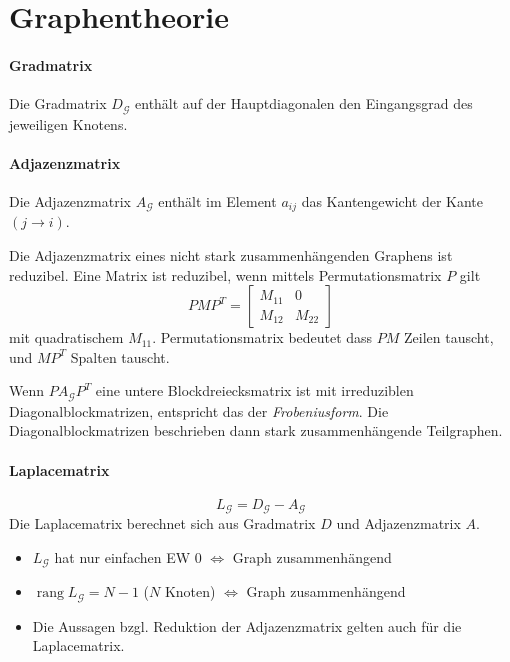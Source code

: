 \section{Graphentheorie}
\paragraph{Gradmatrix}
Die Gradmatrix $D_\mathcal{G}$ enthält auf der Hauptdiagonalen den Eingangsgrad des jeweiligen Knotens.

\paragraph{Adjazenzmatrix}
Die Adjazenzmatrix $A_\mathcal{G}$ enthält im Element $a_{ij}$
das Kantengewicht der Kante $(j \rightarrow i)$.

Die Adjazenzmatrix eines nicht stark zusammenhängenden Graphens ist reduzibel.
Eine Matrix ist reduzibel, wenn mittels Permutationsmatrix $P$ gilt
\begin{equation}
    PMP^T = \begin{bmatrix}
        M_{11} & 0 \\
        M_{12} & M_{22}
    \end{bmatrix}
\end{equation}
mit quadratischem $M_{11}$.
Permutationsmatrix bedeutet dass $PM$ Zeilen tauscht, und $MP^T$ Spalten tauscht.

Wenn $PA_\mathcal{G}P^T$ eine untere Blockdreiecksmatrix ist mit irreduziblen
Diagonalblockmatrizen, entspricht das der \emph{Frobeniusform}.
Die Diagonalblockmatrizen beschrieben dann stark zusammenhängende Teilgraphen.


\paragraph{Laplacematrix}
\begin{equation}
    \tag{Laplacematrix}
    L_\mathcal{G} = D_\mathcal{G} - A_\mathcal{G}
    \label{eqn:laplace_matrix}
\end{equation}
Die Laplacematrix berechnet sich aus Gradmatrix $D$ und
Adjazenzmatrix $A$.

\begin{itemize}
    \item $L_\mathcal{G}$ hat nur einfachen EW 0 $\iff$ Graph zusammenhängend
    \item $\operatorname{rang} L_\mathcal{G} = N-1$ ($N$ Knoten) $\iff$ Graph zusammenhängend
    \item Die Aussagen bzgl. Reduktion der Adjazenzmatrix gelten auch für die Laplacematrix.
\end{itemize}


